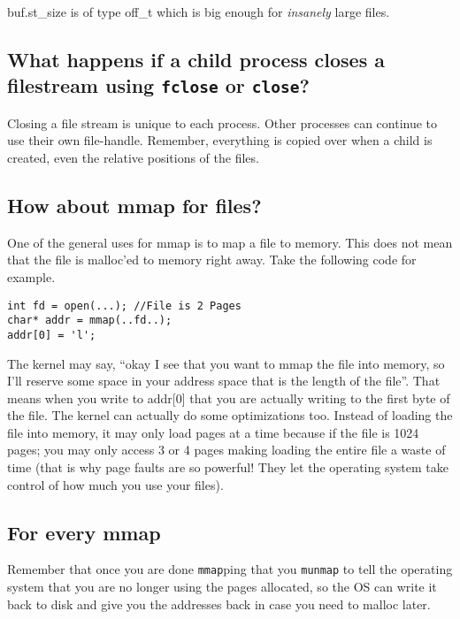 \begin{Shaded}
\begin{Highlighting}[]
 
\NormalTok{)\{}
     \NormalTok{-}\NormalTok{;}
\NormalTok{\}}
 
\end{Highlighting}
\end{Shaded}

buf.st\_size is of type off\_t which is big enough for \emph{insanely}
large files.

\subsection{\texorpdfstring{What happens if a child process closes a
filestream using \texttt{fclose} or
\texttt{close}?}{What happens if a child process closes a filestream using fclose or close?}}\label{what-happens-if-a-child-process-closes-a-filestream-using-fclose-or-close}

Closing a file stream is unique to each process. Other processes can
continue to use their own file-handle. Remember, everything is copied
over when a child is created, even the relative positions of the files.

\subsection{How about mmap for files?}\label{how-about-mmap-for-files}

One of the general uses for mmap is to map a file to memory. This does
not mean that the file is malloc'ed to memory right away. Take the
following code for example.

\begin{verbatim}
int fd = open(...); //File is 2 Pages
char* addr = mmap(..fd..);
addr[0] = 'l';
\end{verbatim}

The kernel may say, ``okay I see that you want to mmap the file into
memory, so I'll reserve some space in your address space that is the
length of the file''. That means when you write to addr{[}0{]} that you
are actually writing to the first byte of the file. The kernel can
actually do some optimizations too. Instead of loading the file into
memory, it may only load pages at a time because if the file is 1024
pages; you may only access 3 or 4 pages making loading the entire file a
waste of time (that is why page faults are so powerful! They let the
operating system take control of how much you use your files).

\subsection{For every mmap}\label{for-every-mmap}

Remember that once you are done \texttt{mmap}ping that you
\texttt{munmap} to tell the operating system that you are no longer
using the pages allocated, so the OS can write it back to disk and give
you the addresses back in case you need to malloc later.
